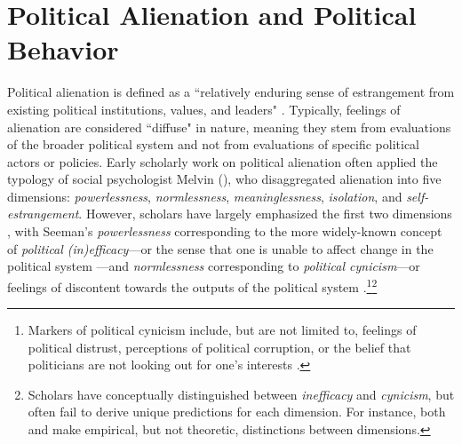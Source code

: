 \documentclass[12pt]{article}
\begin{document}

\section*{Political Alienation and Political Behavior}

Political alienation is defined as a ``relatively enduring sense of estrangement from existing political institutions, values, and leaders" \parencite[][3]{citrin1975personal}. Typically, feelings of alienation are considered ``diffuse" \parencite{easton1965systems} in nature, meaning they stem from evaluations of the broader political system and not from evaluations of specific political actors or policies. Early scholarly work on political alienation often applied the typology of social psychologist Melvin \citeauthor{seeman1959on} (\citeyear{seeman1959on,seeman1975alienation}), who disaggregated alienation into five dimensions: \textit{powerlessness}, \textit{normlessness}, \textit{meaninglessness}, \textit{isolation}, and \textit{self-estrangement}. However, scholars have largely emphasized the first two dimensions \parencite[e.g.,][]{olsen1969two,finifter1970dimensions}, with Seeman's \textit{powerlessness} corresponding to the more widely-known concept of \textit{political (in)efficacy}---or the sense that one is unable to affect change in the political system \parencite{campbell1954voter}---and \textit{normlessness} corresponding to \textit{political cynicism}---or feelings of discontent towards the outputs of the political system \parencite{gamson1968power,miller1974political}.\footnote{Markers of political cynicism include, but are not limited to, feelings of political distrust, perceptions of political corruption, or the belief that politicians are not looking out for one's interests \parencite{miller1974political,dyck2018primary}.}\footnote{Scholars have conceptually distinguished between \textit{inefficacy} and \textit{cynicism}, but often fail to derive unique predictions for each dimension. For instance, both \textcite{citrin1975personal} and \textcite{southwell1998electoral} make empirical, but not theoretic, distinctions between dimensions.}
\end{document}
